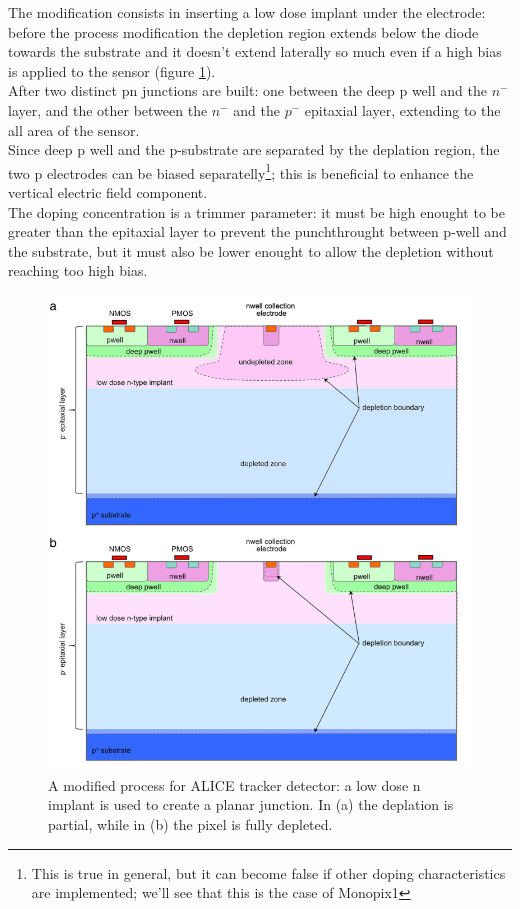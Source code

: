       The modification consists in inserting a low dose implant under the electrode: before the process modification the depletion region extends below the diode towards the substrate and it doesn't extend laterally so much even if a high bias is applied to the sensor (figure \ref{fig:modified_process}). \\
      After two distinct pn junctions are built: one between the deep p well and the $n^-$ layer, and the other between the $n^-$ and the $p^-$ epitaxial layer, extending to the all area of the sensor.\\ 
      Since deep p well and the p-substrate are separated by the deplation region, the two p electrodes can be biased separatelly\footnote{This is true in general, but it can become false if other doping characteristics are implemented; we'll see that this is the case of Monopix1}; this is beneficial to enhance the vertical electric field component.\\
      The doping concentration is a trimmer parameter: it must be high enought to be greater than the epitaxial layer to prevent the punchthrought between p-well and the substrate, but it must also be lower enought to allow the depletion without reaching too high bias.
      \begin{figure}
         \centering
         \includegraphics[width=.7\linewidth]{figures/Pixel_detectors/modified_process.png}
         \caption{A modified process for ALICE tracker detector: a low dose n implant is used to create a planar junction. In (a) the deplation is partial, while in (b) the pixel is fully depleted.}
         \label{fig:modified_process}
      \end{figure}

